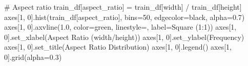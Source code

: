 \documentclass[
  letterpaper,
  DIV=11,
  numbers=noendperiod]{scrartcl}
\newenvironment{Shaded}{\begin{snugshade}}{\end{snugshade}}
\newcommand{\CommentTok}[1]{\textcolor[rgb]{0.37,0.37,0.37}{#1}}
\newcommand{\DecValTok}[1]{\textcolor[rgb]{0.68,0.00,0.00}{#1}}
\newcommand{\FloatTok}[1]{\textcolor[rgb]{0.68,0.00,0.00}{#1}}
\newcommand{\NormalTok}[1]{\textcolor[rgb]{0.00,0.23,0.31}{#1}}
\newcommand{\OperatorTok}[1]{\textcolor[rgb]{0.37,0.37,0.37}{#1}}
\newcommand{\StringTok}[1]{\textcolor[rgb]{0.13,0.47,0.30}{#1}}
\renewenvironment{Shaded}{%
  \begin{tcolorbox}[%
    enhanced,%
    colback=codebg,%
    colframe=codebg,%
    borderline west={3pt}{0pt}{sectionblue},%
    boxrule=0pt,%
    arc=0pt,%
    boxsep=5pt,%
    left=2mm,%
    right=2mm,%
    top=2mm,%
    bottom=2mm%
  ]%
}{%
  \end{tcolorbox}%
}
\begin{document}
\begin{Shaded}
\begin{Highlighting}[]
\CommentTok{\# Aspect ratio}
\NormalTok{train\_df[}\StringTok{\textquotesingle{}aspect\_ratio\textquotesingle{}}\NormalTok{] }\OperatorTok{=}\NormalTok{ train\_df[}\StringTok{\textquotesingle{}width\textquotesingle{}}\NormalTok{] }\OperatorTok{/}\NormalTok{ train\_df[}\StringTok{\textquotesingle{}height\textquotesingle{}}\NormalTok{]}
\NormalTok{axes[}\DecValTok{1}\NormalTok{, }\DecValTok{0}\NormalTok{].hist(train\_df[}\StringTok{\textquotesingle{}aspect\_ratio\textquotesingle{}}\NormalTok{], bins}\OperatorTok{=}\DecValTok{50}\NormalTok{, edgecolor}\OperatorTok{=}\StringTok{\textquotesingle{}black\textquotesingle{}}\NormalTok{, alpha}\OperatorTok{=}\FloatTok{0.7}\NormalTok{)}
\NormalTok{axes[}\DecValTok{1}\NormalTok{, }\DecValTok{0}\NormalTok{].axvline(}\FloatTok{1.0}\NormalTok{, color}\OperatorTok{=}\StringTok{\textquotesingle{}green\textquotesingle{}}\NormalTok{, linestyle}\OperatorTok{=}\StringTok{\textquotesingle{}{-}{-}\textquotesingle{}}\NormalTok{, label}\OperatorTok{=}\StringTok{\textquotesingle{}Square (1:1)\textquotesingle{}}\NormalTok{)}
\NormalTok{axes[}\DecValTok{1}\NormalTok{, }\DecValTok{0}\NormalTok{].set\_xlabel(}\StringTok{\textquotesingle{}Aspect Ratio (width/height)\textquotesingle{}}\NormalTok{)}
\NormalTok{axes[}\DecValTok{1}\NormalTok{, }\DecValTok{0}\NormalTok{].set\_ylabel(}\StringTok{\textquotesingle{}Frequency\textquotesingle{}}\NormalTok{)}
\NormalTok{axes[}\DecValTok{1}\NormalTok{, }\DecValTok{0}\NormalTok{].set\_title(}\StringTok{\textquotesingle{}Aspect Ratio Distribution\textquotesingle{}}\NormalTok{)}
\NormalTok{axes[}\DecValTok{1}\NormalTok{, }\DecValTok{0}\NormalTok{].legend()}
\NormalTok{axes[}\DecValTok{1}\NormalTok{, }\DecValTok{0}\NormalTok{].grid(alpha}\OperatorTok{=}\FloatTok{0.3}\NormalTok{)}
\end{Highlighting}
\end{Shaded}
\end{document}
